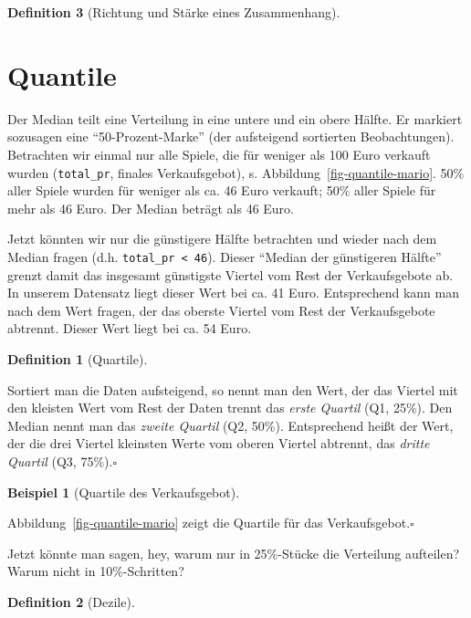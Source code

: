 \documentclass[
  a4paper,
  DIV=11]{scrreprt}
\theoremstyle{definition}
\theoremstyle{definition}
\newtheorem{example}{Beispiel}[chapter]
\theoremstyle{definition}
\newtheorem{definition}{Definition}[chapter]
\theoremstyle{remark}
\begin{document}
\begin{definition}[Richtung und Stärke eines
Zusammenhang]
\section{Quantile}\label{quantile}

Der Median teilt eine Verteilung in eine untere und ein obere Hälfte. Er
markiert sozusagen eine ``50-Prozent-Marke'' (der aufsteigend sortierten
Beobachtungen). Betrachten wir einmal nur alle Spiele, die für weniger
als 100 Euro verkauft wurden (\texttt{total\_pr}, finales
Verkaufsgebot), s. Abbildung~\ref{fig-quantile-mario}. 50\% aller Spiele
wurden für weniger als ca. 46 Euro verkauft; 50\% aller Spiele für mehr
als 46 Euro. Der Median beträgt als 46 Euro.

Jetzt könnten wir nur die günstigere Hälfte betrachten und wieder nach
dem Median fragen (d.h. \texttt{total\_pr\ \textless{}\ 46}). Dieser
``Median der günstigeren Hälfte'' grenzt damit das insgesamt günstigste
Viertel vom Rest der Verkaufsgebote ab. In unserem Datensatz liegt
dieser Wert bei ca. 41 Euro. Entsprechend kann man nach dem Wert fragen,
der das oberste Viertel vom Rest der Verkaufsgebote abtrennt. Dieser
Wert liegt bei ca. 54 Euro.

\begin{definition}[Quartile]\protect\hypertarget{def-quartile}{}\label{def-quartile}

Sortiert man die Daten aufsteigend, so nennt man den Wert, der das
Viertel mit den kleisten Wert vom Rest der Daten trennt das \emph{erste
Quartil} (Q1, 25\%). Den Median nennt man das \emph{zweite Quartil} (Q2,
50\%). Entsprechend heißt der Wert, der die drei Viertel kleinsten Werte
vom oberen Viertel abtrennt, das \emph{dritte Quartil} (Q3,
75\%).\(\square\)

\end{definition}

\begin{example}[Quartile des
Verkaufsgebot]\protect\hypertarget{exm-mario-qs}{}\label{exm-mario-qs}

Abbildung~\ref{fig-quantile-mario} zeigt die Quartile für das
Verkaufsgebot.\(\square\)

\end{example}

Jetzt könnte man sagen, hey, warum nur in 25\%-Stücke die Verteilung
aufteilen? Warum nicht in 10\%-Schritten?

\begin{definition}[Dezile]\protect\hypertarget{def-dezile}{}\label{def-dezile}


\end{definition}
\end{definition}
\end{document}
